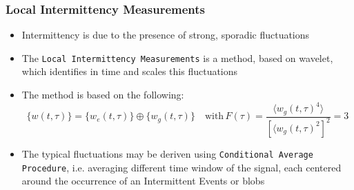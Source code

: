 \documentclass[t,10pt]{beamer}
\begin{document}
\begin{frame}
  \frametitle{Local Intermittency Measurements}
  \begin{itemize}
\item Intermittency is due to the presence of strong, sporadic fluctuations
\item The \textcolor{ta3chameleon}{\texttt{Local Intermittency
      Measurements}} is a method, based on wavelet, which identifies in time and
  scales this fluctuations {\footnotesize\parencite{Antoni:2001tm}}
  \item The method is based on the following:
\begin{equation*}
\{w(t,\tau)\} = \{w_e(t,\tau)\}\oplus \{w_g(t,\tau)\} \quad
\text{with} \,
F(\tau)=\frac{\langle w_g(t,\tau)^4\rangle}{[\langle w_g(t,\tau)^2]^2}
= 3
\end{equation*}
\item The typical fluctuations may be deriven using
  \textcolor{ta3chameleon}{\texttt{Conditional Average Procedure}},
  i.e. averaging different time window of the signal, each 
  centered around the occurrence of an
  \alert{Intermittent Events} or \alert{blobs}

  \end{itemize}
\end{frame}
\end{document}
